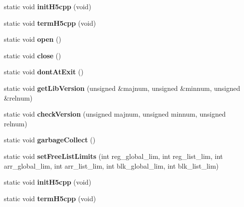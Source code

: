 \begin{DoxyCompactItemize}
\item 
\mbox{\label{class_h5_1_1_h5_library_aeb96412de5e2a10b82e62194471198a8}} 
static void {\bfseries init\+H5cpp} (void)
\item 
\mbox{\label{class_h5_1_1_h5_library_a5cbcea63cee580290685246a7aa104c3}} 
static void {\bfseries term\+H5cpp} (void)
\item 
\mbox{\label{class_h5_1_1_h5_library_a2737e8d522bcf3c318b682a531e9d1c8}} 
static void {\bfseries open} ()
\item 
\mbox{\label{class_h5_1_1_h5_library_a31444dc0661822fbc891e5e8ab000d3b}} 
static void {\bfseries close} ()
\item 
\mbox{\label{class_h5_1_1_h5_library_a56dbd0c8eafa7a12d0f803407e6d032c}} 
static void {\bfseries dont\+At\+Exit} ()
\item 
\mbox{\label{class_h5_1_1_h5_library_a13a92c6934b43779abd1f1b55f17f15a}} 
static void {\bfseries get\+Lib\+Version} (unsigned \&majnum, unsigned \&minnum, unsigned \&relnum)
\item 
\mbox{\label{class_h5_1_1_h5_library_ad563a40fe51be7b2411b81c2360371fc}} 
static void {\bfseries check\+Version} (unsigned majnum, unsigned minnum, unsigned relnum)
\item 
\mbox{\label{class_h5_1_1_h5_library_a430390b75a266e560d74cc35d4dc3462}} 
static void {\bfseries garbage\+Collect} ()
\item 
\mbox{\label{class_h5_1_1_h5_library_a2f112441448671e3389e1d9bf8082b70}} 
static void {\bfseries set\+Free\+List\+Limits} (int reg\+\_\+global\+\_\+lim, int reg\+\_\+list\+\_\+lim, int arr\+\_\+global\+\_\+lim, int arr\+\_\+list\+\_\+lim, int blk\+\_\+global\+\_\+lim, int blk\+\_\+list\+\_\+lim)
\item 
\mbox{\label{class_h5_1_1_h5_library_aeb96412de5e2a10b82e62194471198a8}} 
static void {\bfseries init\+H5cpp} (void)
\item 
\mbox{\label{class_h5_1_1_h5_library_a5cbcea63cee580290685246a7aa104c3}} 
static void {\bfseries term\+H5cpp} (void)
\end{DoxyCompactItemize}


